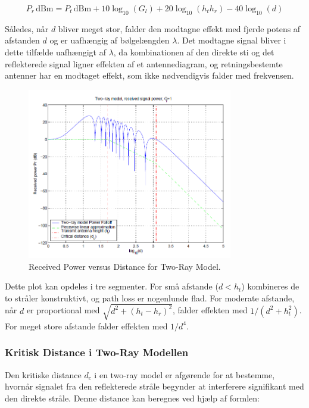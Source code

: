 \documentclass[a4paper,12pt]{book}
\begin{document}
	\[
	P_r \, \text{dBm} = P_t \, \text{dBm} + 10 \log_{10}(G_l) + 20 \log_{10}(h_t h_r) - 40 \log_{10}(d)
	\]
	
	\noindent
	Således, når \( d \) bliver meget stor, falder den modtagne effekt med fjerde potens af afstanden \( d \) og er uafhængig af bølgelængden \( \lambda \). Det modtagne signal bliver i dette tilfælde uafhængigt af \( \lambda \), da kombinationen af den direkte sti og det reflekterede signal ligner effekten af et antennediagram, og retningsbestemte antenner har en modtaget effekt, som ikke nødvendigvis falder med frekvensen.
	
	\begin{figure}[h]
		\centering
		\includegraphics[width=0.8\textwidth]{fig/fig5.png}
		\caption{Received Power versus Distance for Two-Ray Model.}
		\label{fig:two_ray_falloff}
	\end{figure}
	
	\noindent
	Dette plot kan opdeles i tre segmenter. For små afstande (\( d < h_t \)) kombineres de to stråler konstruktivt, og path loss er nogenlunde flad. For moderate afstande, når \( d \) er proportional med \( \sqrt{d^2 + (h_t - h_r)^2} \), falder effekten med \( 1/(d^2 + h_t^2) \). For meget store afstande falder effekten med \( 1/d^4 \).
	
	\subsubsection{Kritisk Distance i Two-Ray Modellen}
	
	\noindent Den kritiske distance \( d_c \) i en two-ray model er afgørende for at bestemme, hvornår signalet fra den reflekterede stråle begynder at interferere signifikant med den direkte stråle. Denne distance kan beregnes ved hjælp af formlen:
	
\end{document}
